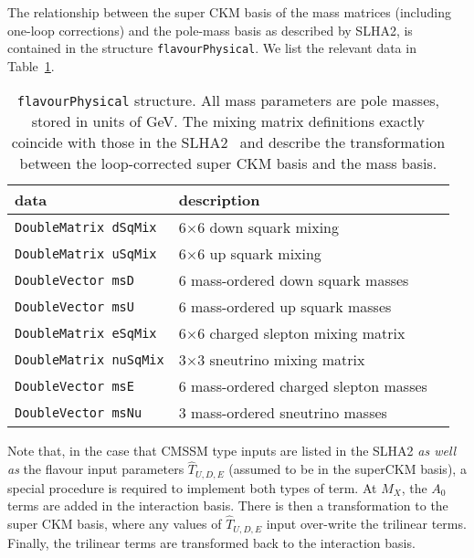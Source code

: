 \documentclass[]{article}
\def\code#1{\small{\tt #1}\normalsize}
\begin{document}
The relationship between the super CKM basis of the mass matrices (including
one-loop corrections) and the pole-mass basis as described by SLHA2, is
contained in the structure 
\code{flavourPhysical}. We list the relevant data in Table~\ref{tab:flavphys}.
\begin{table}\begin{center}\begin{tabular}{lll} 
data & description \\ \hline
\code{DoubleMatrix dSqMix} & 6$\times$6 down squark mixing \\
\code{DoubleMatrix uSqMix} & 6$\times$6 up squark mixing \\
\code{DoubleVector msD} & 6 mass-ordered down squark masses\\
\code{DoubleVector msU} & 6 mass-ordered up squark masses\\
\code{DoubleMatrix eSqMix} & 6$\times$6 charged slepton mixing matrix \\
\code{DoubleMatrix nuSqMix} & 3$\times$3 sneutrino mixing matrix \\
\code{DoubleVector msE} & 6 mass-ordered charged slepton masses  \\
\code{DoubleVector msNu} & 3 mass-ordered sneutrino masses \\
\end{tabular}\caption{\label{tab:flavphys}\code{flavourPhysical} structure. All mass parameters
  are pole 
  masses, stored in
  units of GeV. The mixing matrix definitions exactly coincide with
  those in the 
SLHA2~\protect\cite{lhacc2} and describe the transformation between the
loop-corrected super CKM basis and the mass basis.}\end{center}\end{table}
Note that, in the case that CMSSM type inputs are listed in the SLHA2 {\em
  as well as} the flavour input parameters $\hat T_{U,D,E}$ (assumed to be in
the superCKM basis), a special procedure is required to implement both types
of term.
At $M_X$, the $A_0$ terms are added in the interaction basis. There is then a
transformation to the super CKM basis, where any values of $\hat T_{U,D,E}$
input over-write the trilinear terms. Finally, the trilinear terms are
transformed back to the interaction basis. 
\end{document}

